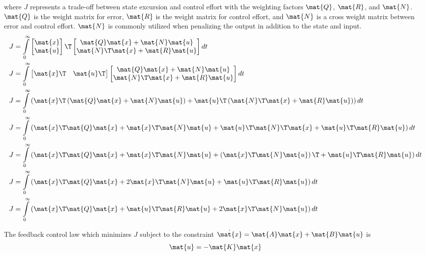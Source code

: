 where $J$ represents a trade-off between \gls{state} excursion and
\gls{control effort} with the weighting factors $\mat{Q}$, $\mat{R}$, and
$\mat{N}$. $\mat{Q}$ is the weight matrix for \gls{error}, $\mat{R}$ is the
weight matrix for \gls{control effort}, and $\mat{N}$ is a cross weight matrix
between \gls{error} and \gls{control effort}. $\mat{N}$ is commonly utilized
when penalizing the output in addition to the state and input.
\begin{align*}
  J &= \int\limits_0^\infty
    \begin{bmatrix}
      \mat{x} \\
      \mat{u}
    \end{bmatrix}\T
    \begin{bmatrix}
      \mat{Q}\mat{x} + \mat{N}\mat{u} \\
      \mat{N}\T\mat{x} + \mat{R}\mat{u}
    \end{bmatrix} dt \\
  J &= \int\limits_0^\infty
    \begin{bmatrix}
      \mat{x}\T & \mat{u}\T
    \end{bmatrix}
    \begin{bmatrix}
      \mat{Q}\mat{x} + \mat{N}\mat{u} \\
      \mat{N}\T\mat{x} + \mat{R}\mat{u}
    \end{bmatrix} dt \\
  J &= \int\limits_0^\infty
    \left(\mat{x}\T\left(\mat{Q}\mat{x} + \mat{N}\mat{u}\right) +
      \mat{u}\T\left(\mat{N}\T\mat{x} + \mat{R}\mat{u}\right)\right) dt \\
  J &= \int\limits_0^\infty
    \left(\mat{x}\T\mat{Q}\mat{x} + \mat{x}\T\mat{N}\mat{u} +
      \mat{u}\T\mat{N}\T\mat{x} + \mat{u}\T\mat{R}\mat{u}\right) dt \\
  J &= \int\limits_0^\infty
    \left(\mat{x}\T\mat{Q}\mat{x} + \mat{x}\T\mat{N}\mat{u} +
      \left(\mat{x}\T\mat{N}\mat{u}\right)\T + \mat{u}\T\mat{R}\mat{u}\right)
    dt \\
  J &= \int\limits_0^\infty
    \left(\mat{x}\T\mat{Q}\mat{x} + 2\mat{x}\T\mat{N}\mat{u} +
      \mat{u}\T\mat{R}\mat{u}\right) dt \\
  J &= \int\limits_0^\infty
    \left(\mat{x}\T\mat{Q}\mat{x} + \mat{u}\T\mat{R}\mat{u} +
      2\mat{x}\T\mat{N}\mat{u}\right) dt
\end{align*}

The feedback \gls{control law} which minimizes $J$ subject to the constraint
$\dot{\mat{x}} = \mat{A}\mat{x} + \mat{B}\mat{u}$ is
\begin{equation*}
  \mat{u} = -\mat{K}\mat{x}
\end{equation*}

